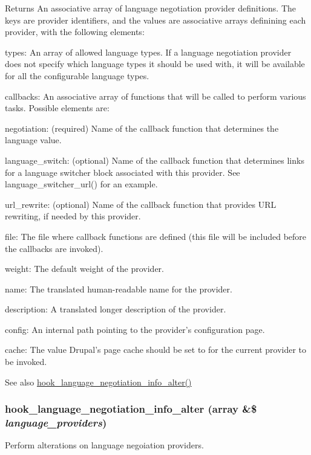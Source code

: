 \begin{DoxyReturn}{Returns}
An associative array of language negotiation provider definitions. The keys are provider identifiers, and the values are associative arrays definining each provider, with the following elements:
\begin{DoxyItemize}
\item types: An array of allowed language types. If a language negotiation provider does not specify which language types it should be used with, it will be available for all the configurable language types.
\item callbacks: An associative array of functions that will be called to perform various tasks. Possible elements are:
\begin{DoxyItemize}
\item negotiation: (required) Name of the callback function that determines the language value.
\item language\_\-switch: (optional) Name of the callback function that determines links for a language switcher block associated with this provider. See language\_\-switcher\_\-url() for an example.
\item url\_\-rewrite: (optional) Name of the callback function that provides URL rewriting, if needed by this provider.
\end{DoxyItemize}
\item file: The file where callback functions are defined (this file will be included before the callbacks are invoked).
\item weight: The default weight of the provider.
\item name: The translated human-\/readable name for the provider.
\item description: A translated longer description of the provider.
\item config: An internal path pointing to the provider's configuration page.
\item cache: The value Drupal's page cache should be set to for the current provider to be invoked.
\end{DoxyItemize}
\end{DoxyReturn}
\begin{DoxySeeAlso}{See also}
\hyperlink{group__language__negotiation_gacaed046505a0a8470514731b86910089}{hook\_\-language\_\-negotiation\_\-info\_\-alter()} 
\end{DoxySeeAlso}
\hypertarget{group__language__negotiation_gacaed046505a0a8470514731b86910089}{
\subsubsection[{hook\_\-language\_\-negotiation\_\-info\_\-alter}]{\setlength{\rightskip}{0pt plus 5cm}hook\_\-language\_\-negotiation\_\-info\_\-alter (array \&\$ {\em language\_\-providers})}}
\label{group__language__negotiation_gacaed046505a0a8470514731b86910089}
Perform alterations on language negoiation providers.


